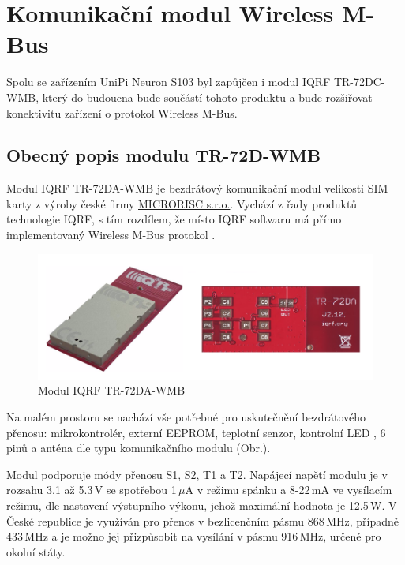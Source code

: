 \chapter{Komunikační modul Wireless M-Bus}

Spolu se zařízením UniPi Neuron S103 byl zapůjčen i modul IQRF TR-72DC-WMB, který do budoucna bude součástí tohoto produktu a bude rozšiřovat konektivitu zařízení o protokol Wireless M-Bus. 

\section{Obecný popis modulu TR-72D-WMB}

Modul IQRF TR-72DA-WMB je bezdrátový komunikační modul velikosti SIM karty z výroby české firmy \href{http://microrisc.com/cs/}{MICRORISC s.r.o.}. Vychází z řady produktů technologie IQRF, s tím rozdílem, že místo IQRF softwaru má přímo implementovaný Wireless M-Bus protokol \cite{iqrfmodul}. 

 \begin{figure}[!h]
  \begin{center}
    \includegraphics[scale=0.6]{obrazky/modul_modul}
  \end{center}
  \caption{Modul IQRF TR-72DA-WMB \cite{iqrfmodul}}
\end{figure}

Na malém prostoru se nachází vše potřebné pro uskutečnění bezdrátového přenosu: mikrokontrolér, externí EEPROM, teplotní senzor, kontrolní LED , 6 pinů a anténa dle typu komunikačního modulu (Obr.\label{BlokovkaIQRF}).



Modul podporuje módy přenosu S1, S2, T1 a T2. Napájecí napětí modulu je v rozsahu 3.1 až 5.3\,V se spotřebou 1\,$\mu$A v režimu spánku a 8-22\,mA ve vysílacím režimu, dle nastavení výstupního výkonu, jehož maximální hodnota je 12.5\,W.
V České republice je využíván pro přenos v bezlicenčním pásmu 868\,MHz, případně 433\,MHz a je možno jej přizpůsobit na vysílání v pásmu 916\,MHz, určené pro okolní státy.\newline


